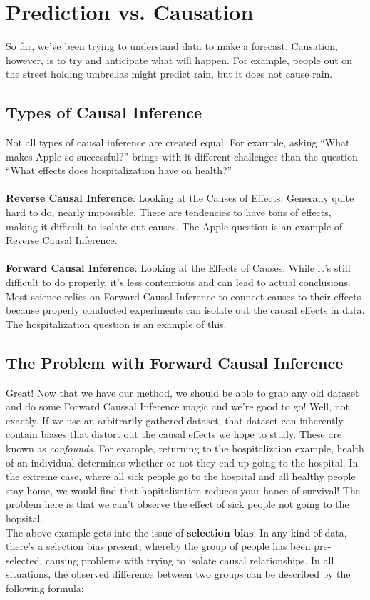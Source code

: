
\section{Prediction vs. Causation}
So far, we've been trying to understand data to make a forecast. Causation, however, is to try and anticipate what will happen. For example, people out on the street holding umbrellas might predict rain, but it does not cause rain. \\
\subsection{Types of Causal Inference}
Not all types of causal inference are created equal. For example, asking ``What makes Apple so successful?'' brings with it different challenges than the question ``What effects does hospitalization have on health?''\\\\
\textbf{Reverse Causal Inference}: Looking at the Causes of Effects. Generally quite hard to do, nearly impossible. There are tendencies to have tons of effects, making it difficult to isolate out causes. The Apple question is an example of Reverse Causal Inference. \\ \\
\textbf{Forward Causal Inference}: Looking at the Effects of Causes. While it's still difficult to do properly, it's less contentious and can lead to actual conclusions. Most science relies on Forward Causal Inference to connect causes to their effects because properly conducted experiments can isolate out the causal effects in data. The hospitalization question is an example of this.\\

\subsection{The Problem with Forward Causal Inference}
Great! Now that we have our method, we should be able to grab any old dataset and do some Forward Caussal Inference magic and we're good to go! Well, not exactly. If we use an arbitrarily gathered dataset, that dataset can inherently contain biases that distort out the causal effects we hope to study. These are known as \textit{confounds}. For example, returning to the hospitalizaion example, health of an individual determines whether or not they end up going to the hospital. In the extreme case, where all sick people go to the hospital and all healthy people stay home, we would find that hopitalization reduces your hance of survival! The problem here is that we can't observe the effect of sick people not going to the hopsital. \\
The above example gets into the issue of \textbf{selection bias}. In any kind of data, there's a selection bias present, whereby the group of people has been pre-selected, causing problems with trying to isolate causal relationships. In all situations, the observed difference between two groups can be described by the following formula:

